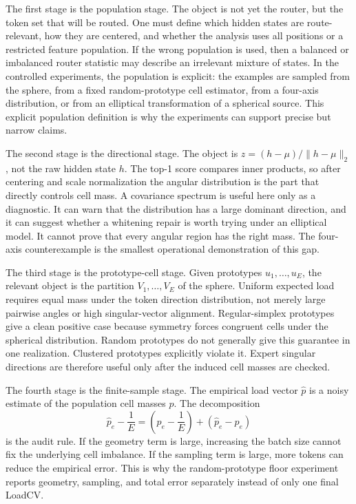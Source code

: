 The first stage is the population stage. The object is not yet the router, but
the token set that will be routed. One must define which hidden states are
route-relevant, how they are centered, and whether the analysis uses all
positions or a restricted feature population. If the wrong population is used,
then a balanced or imbalanced router statistic may describe an irrelevant
mixture of states. In the controlled experiments, the population is explicit:
the examples are sampled from the sphere, from a fixed random-prototype cell
estimator, from a four-axis distribution, or from an elliptical transformation
of a spherical source. This explicit population definition is why the
experiments can support precise but narrow claims.

The second stage is the directional stage. The object is
$z=(h-\mu)/\|h-\mu\|_2$, not the raw hidden state $h$. The top-1 score compares
inner products, so after centering and scale normalization the angular
distribution is the part that directly controls cell mass. A covariance
spectrum is useful here only as a diagnostic. It can warn that the distribution
has a large dominant direction, and it can suggest whether a whitening repair is
worth trying under an elliptical model. It cannot prove that every angular
region has the right mass. The four-axis counterexample is the smallest
operational demonstration of this gap.

The third stage is the prototype-cell stage. Given prototypes
$u_1,\ldots,u_E$, the relevant object is the partition
$V_1,\ldots,V_E$ of the sphere. Uniform expected load requires equal mass under
the token direction distribution, not merely large pairwise angles or high
singular-vector alignment. Regular-simplex prototypes give a clean positive
case because symmetry forces congruent cells under the spherical distribution.
Random prototypes do not generally give this guarantee in one realization.
Clustered prototypes explicitly violate it. Expert singular directions are
therefore useful only after the induced cell masses are checked.

The fourth stage is the finite-sample stage. The empirical load vector
$\widehat p$ is a noisy estimate of the population cell masses $p$. The
decomposition
\[
\widehat p_e-\frac{1}{E}=
\left(p_e-\frac{1}{E}\right)+(\widehat p_e-p_e)
\]
is the audit rule. If the geometry term is large, increasing the batch size
cannot fix the underlying cell imbalance. If the sampling term is large, more
tokens can reduce the empirical error. This is why the random-prototype floor
experiment reports geometry, sampling, and total error separately instead of
only one final LoadCV.

